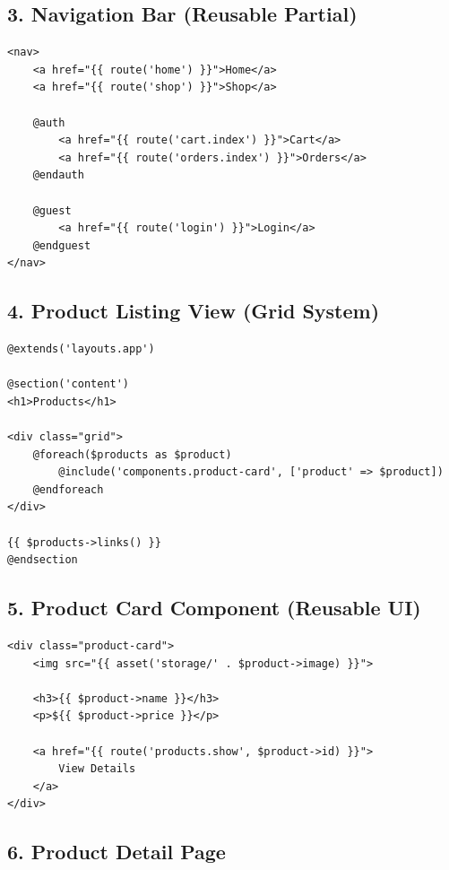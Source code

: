 \documentclass[12pt,a4paper]{article}
\begin{document}
\subsection{3. Navigation Bar (Reusable Partial)}

\begin{verbatim}
<nav>
    <a href="{{ route('home') }}">Home</a>
    <a href="{{ route('shop') }}">Shop</a>

    @auth
        <a href="{{ route('cart.index') }}">Cart</a>
        <a href="{{ route('orders.index') }}">Orders</a>
    @endauth

    @guest
        <a href="{{ route('login') }}">Login</a>
    @endguest
</nav>
\end{verbatim}

\subsection{4. Product Listing View (Grid System)}

\begin{verbatim}
@extends('layouts.app')

@section('content')
<h1>Products</h1>

<div class="grid">
    @foreach($products as $product)
        @include('components.product-card', ['product' => $product])
    @endforeach
</div>

{{ $products->links() }}
@endsection
\end{verbatim}

\subsection{5. Product Card Component (Reusable UI)}

\begin{verbatim}
<div class="product-card">
    <img src="{{ asset('storage/' . $product->image) }}">

    <h3>{{ $product->name }}</h3>
    <p>${{ $product->price }}</p>

    <a href="{{ route('products.show', $product->id) }}">
        View Details
    </a>
</div>
\end{verbatim}

\subsection{6. Product Detail Page}
\end{document}
